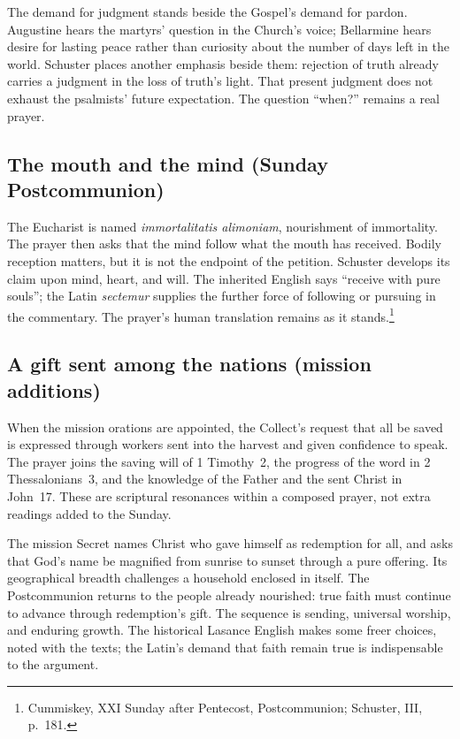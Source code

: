 The demand for judgment stands beside the Gospel's demand for pardon.
Augustine hears the martyrs' question in the Church's voice; Bellarmine
hears desire for lasting peace rather than curiosity about the number
of days left in the world. Schuster places another emphasis beside
them: rejection of truth already carries a judgment in the loss of
truth's light. That present judgment does not exhaust the psalmists'
future expectation. The question ``when?'' remains a real prayer.

\subsection{The mouth and the mind (Sunday Postcommunion)}
The Eucharist is named \textit{immortalitatis alimoniam}, nourishment
of immortality. The prayer then asks that the mind follow what the mouth
has received. Bodily reception matters, but it is not the endpoint of
the petition. Schuster develops its claim upon mind, heart, and will.
The inherited English says ``receive with pure souls''; the Latin
\textit{sectemur} supplies the further force of following or pursuing
in the commentary. The prayer's human translation remains as it
stands.\footnote{Cummiskey, XXI Sunday after Pentecost, Postcommunion;
Schuster, III, p.~181.}

\subsection{A gift sent among the nations (mission additions)}
When the mission orations are appointed, the Collect's request that
all be saved is expressed through workers sent into the harvest and
given confidence to speak. The prayer joins the saving will of
1 Timothy~2, the progress of the word in 2 Thessalonians~3, and the
knowledge of the Father and the sent Christ in John~17. These are
scriptural resonances within a composed prayer, not extra readings
added to the Sunday.

The mission Secret names Christ who gave himself as redemption for all,
and asks that God's name be magnified from sunrise to sunset through a
pure offering. Its geographical breadth challenges a household enclosed
in itself. The Postcommunion returns to the people already nourished:
true faith must continue to advance through redemption's gift. The
sequence is sending, universal worship, and enduring growth. The
historical Lasance English makes some freer choices, noted with the
texts; the Latin's demand that faith remain true is indispensable to
the argument.

